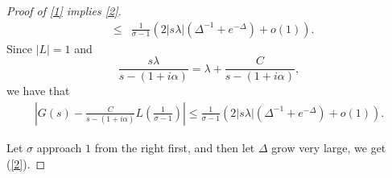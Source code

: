 \documentclass[10pt,a4paper]{amsart}
\newcommand{\NN}{{\mathcal N}}
\begin{document}
\begin{proof}[Proof of \eqref{1} implies \eqref{2}]
\begin{eqnarray*}
 & \leq & \frac{1}{\sigma-1}(2\vert s\lambda\vert(\Delta^{-1}+e^{-\Delta})+o(1)).
  \end{eqnarray*}
Since $\vert L\vert=1$ and 
\[
 \frac{s\lambda}{s-(1+i\alpha)} = \lambda+\frac{C}{s-(1+i\alpha)},
 \]
 we have that 
  \begin{equation}\nonumber
    \begin{split}
   \left|G(s)-\frac{C}{s-(1+i\alpha)} L\left(\frac{1}{\sigma-1}\right) \right|
  \leq \frac{1}{\sigma-1}(2\vert s\lambda\vert(\Delta^{-1}+e^{-\Delta})+o(1)).
       \end{split}
 \end{equation}
 
 Let $\sigma$ approach $1$ from the right first, and then let $\Delta$ grow very large, we get (\ref{2}).
 \iffalse
 

\end{proof}
\end{document}

